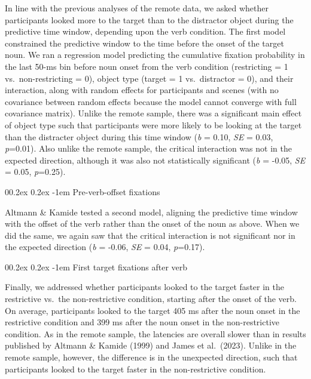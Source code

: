 \documentclass[
  man,floatsintext]{apa6}
\makeatletter
\let\oldparagraph\paragraph
\renewcommand{\paragraph}[1]{\oldparagraph{#1}\mbox{}}
\renewcommand{\paragraph}{\@startsection{paragraph}{4}{\parindent}%
  {0\baselineskip \@plus 0.2ex \@minus 0.2ex}%
  {-1em}%
  {\normalfont\normalsize\bfseries\itshape\typesectitle}}
\makeatother
\begin{document}
In line with the previous analyses of the remote data, we asked whether participants looked more to the target than to the distractor object during the predictive time window, depending upon the verb condition. The first model constrained the predictive window to the time before the onset of the target noun. We ran a regression model predicting the cumulative fixation probability in the last 50-ms bin before noun onset from the verb condition (restricting = 1 vs.~non-restricting = 0), object type (target = 1 vs.~distractor = 0), and their interaction, along with random effects for participants and scenes (with no covariance between random effects because the model cannot converge with full covariance matrix). Unlike the remote sample, there was a significant main effect of object type such that participants were more likely to be looking at the target than the distracter object during this time window (\emph{b} = 0.10, \emph{SE} = 0.03, \emph{p}=0.01). Also unlike the remote sample, the critical interaction was not in the expected direction, although it was also not statistically significant (\emph{b} = -0.05, \emph{SE} = 0.05, \emph{p}=0.25).

\paragraph{Pre-verb-offset fixations}\label{pre-verb-offset-fixations-1}

Altmann \& Kamide tested a second model, aligning the predictive time window with the offset of the verb rather than the onset of the noun as above. When we did the same, we again saw that the critical interaction is not significant nor in the expected direction (\emph{b} = -0.06, \emph{SE} = 0.04, \emph{p}=0.17).

\paragraph{First target fixations after verb}\label{first-target-fixations-after-verb-1}

Finally, we addressed whether participants looked to the target faster in the restrictive vs.~the non-restrictive condition, starting after the onset of the verb. On average, participants looked to the target 405 ms after the noun onset in the restrictive condition and 399 ms after the noun onset in the non-restrictive condition. As in the remote sample, the latencies are overall slower than in results published by Altmann \& Kamide (1999) and James et al.~(2023). Unlike in the remote sample, however, the difference is in the unexpected direction, such that participants looked to the target faster in the non-restrictive condition.
\end{document}
